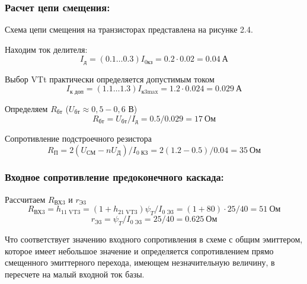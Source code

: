 \subsubsection{Расчет цепи смещения:}

Схема цепи смещения на транзисторах представлена на рисунке 2.4. \par
Находим ток делителя:
\begin{equation}
\label{eq:equation3_11}
 I_{\text{д}} = (0.1 \ldots 0.3) I_{\text{0кз}} = 0.2 \cdot 0.02 = 0.04~\text{А}
\end{equation}

Выбор VTt практически определяется допустимым током
\begin{equation}
\label{eq:equation3_12}
 I_{\text{к доп}} = (1.1 \ldots 1.3) I_{\text{к3max}} = 1.2 \cdot 0.024 = 0.029~\text{А}
\end{equation}

Определяем $R_{\text{бт}}$ ($U_{\text{бт}} \approx 0,5 - 0,6$ В)
\begin{equation}
\label{eq:equation3_13}
 R_{\text{бт}} = U_{\text{бт}} / I_{\text{д}} = 0.5/0.029 = 17~\text{Ом}
\end{equation}

Сопротивление подстроечного резистора
\begin{equation}
\label{eq:equation3_14}
 R_{\text{П}} = 2 (U_{\text{СМ}} - n U_{\text{Д}}) / I_{\text{0 КЗ}} = 2 (1.2 - 0.5) / 0.04 = 35~\text{Ом}
\end{equation}

\subsubsection{Входное сопротивление предоконечного каскада:}
Рассчитаем $R_{\text{ВХ3}}$ и $r_{\text{Э3}}$
\begin{equation}
\label{eq:equation3_15}
 R_{\text{ВХ3}} = h_{\text{11 VT3}} = (1 + h_{\text{21 VT3}}) \psi_T / I_{\text{0 Э3}} = (1 + 80) \cdot 25 / 40 = 51~\text{Ом}
\end{equation}
\begin{equation}
\label{eq:equation3_16}
 r_{\text{Э3}} = \psi_T / I_{\text{0 Э3}} = 25/40 = 0.625~\text{Ом}
\end{equation}

Что соответствует значению входного сопротивления в схеме с общим эмиттером, которое имеет небольшое значение и определяется сопротивлением прямо смещенного эмиттерного перехода, имеющем незначительную величину, в пересчете на малый входной ток базы.

